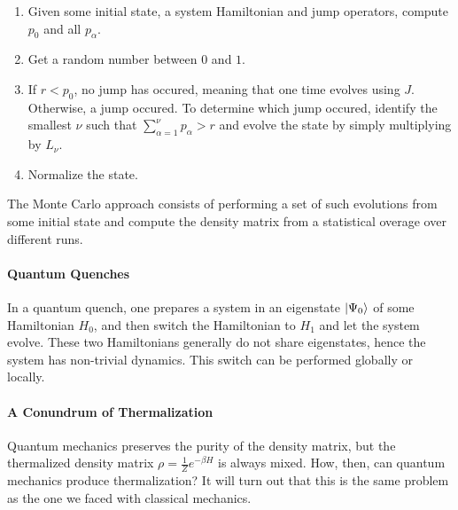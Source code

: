 \begin{enumerate}
	\item Given some initial state, a system Hamiltonian and jump operators, compute $p_{0}$ and all $p_{\alpha}$.
	\item Get a random number between $0$ and $1$.
	\item If $r < p_{0}$, no jump has occured, meaning that one time evolves using $J$. Otherwise, a jump occured. To determine which jump occured, identify the smallest $\nu$ such that $\sum\limits_{\alpha = 1}^{\nu}p_{\alpha}  > r$ and evolve the state by simply multiplying by $L_{\nu}$.
	\item Normalize the state.
\end{enumerate}
The Monte Carlo approach consists of performing a set of such evolutions from some initial state and compute the density matrix from a statistical overage over different runs.

\paragraph{Quantum Quenches}
In a quantum quench, one prepares a system in an eigenstate $\ket{\Psi_{0}}$ of some Hamiltonian $H_{0}$, and then switch the Hamiltonian to $H_{1}$ and let the system evolve. These two Hamiltonians generally do not share eigenstates, hence the system has non-trivial dynamics. This switch can be performed globally or locally.

\paragraph{A Conundrum of Thermalization}
Quantum mechanics preserves the purity of the density matrix, but the thermalized density matrix $\rho = \frac{1}{Z}e^{-\beta H}$ is always mixed. How, then, can quantum mechanics produce thermalization? It will turn out that this is the same problem as the one we faced with classical mechanics.